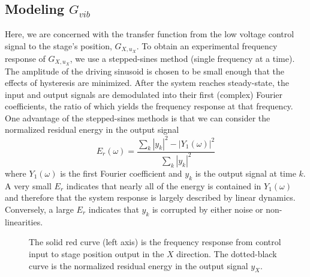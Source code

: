 \documentclass[journal,twocolumn,twoside]{IEEEtran}
\begin{document}
\subsection{Modeling $G_{vib}$}\label{sec:vib_model}
Here, we are concerned with the transfer function from the low voltage control signal to the stage's position, $G_{X,u_X}$. To obtain an experimental frequency response of $G_{X,u_X}$, we use a stepped-sines method (single frequency at a time). The amplitude of the driving sinusoid is chosen to be small enough that the effects of hysteresis are minimized. After the system reaches steady-state, the input and output signals are demodulated into their first (complex) Fourier coefficients, the ratio of which yields the frequency response at that frequency. One advantage of the stepped-sines methods is that we can consider the normalized residual energy in the output signal
\begin{equation}
E_r(\omega) = \frac{\sum_{k} |y_k|^2 - |Y_1(\omega)|^2}{\sum_{k} |y_k|^2}
\end{equation}
where $Y_1(\omega)$ is the first Fourier coefficient and $y_k$ is the output signal at time $k$. A very small $E_r$ indicates that nearly all of the energy is contained in $Y_1(\omega)$ and therefore that the system response is largely described by linear dynamics. Conversely, a large $E_r$ indicates that $y_k$ is corrupted by either noise or non-linearities. 

\begin{figure}
  \centering
  
  \caption{The solid red curve (left axis) is the frequency response from control input to stage position output in the $X$ direction. The dotted-black curve is the normalized residual energy in the output signal $y_X$.}
  \label{fig:Guz2stage_frf}
\end{figure}
\end{document}
